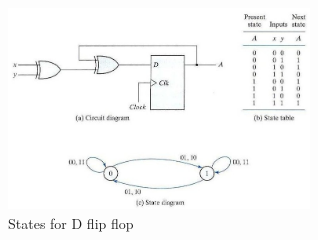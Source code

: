 \documentclass[conference]{IEEEtran}
\begin{document}
% 
% 
% 
% 
\begin{figure}[!b]
\centering\includegraphics[width=8cm]{ss.jpg}
\caption{States for D flip flop}
\label{p2}
\end{figure}
% 
\end{document}
